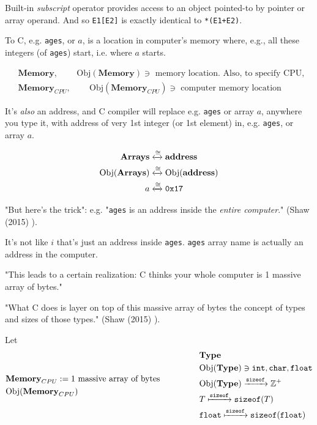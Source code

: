 \documentclass[10pt]{amsart}
\begin{document}
Built-in \emph{subscript} operator provides access to an object pointed-to by pointer or array operand.  And so \verb|E1[E2]| is exactly identical to \verb|*(E1+E2)|.  


To C, e.g. \verb|ages|, or $a$, is a location in computer's memory where, e.g., all these integers (of \verb|ages|) start, i.e. where $a$ starts.  

\[
\begin{aligned}
& \textbf{Memory} , \qquad \, \text{Obj}{(\textbf{Memory})} \ni \text{ memory location.  Also, to specify CPU, } \\ 
& \textbf{Memory}_{CPU} , \qquad \, \text{Obj}{(\textbf{Memory}_{CPU})} \ni \text{ computer memory location }
\end{aligned}
\]

It's \emph{also} an address, and C compiler will replace e.g. \verb|ages| or array $a$, anywhere you type it, with address of very 1st integer (or 1st element) in, e.g. \verb|ages|, or array $a$.  

\[
\begin{gathered}
\begin{aligned}
\textbf{Arrays} & \xleftrightarrow{ \cong } \textbf{address}  \\
\text{Obj}{(\textbf{Arrays} )} & \xleftrightarrow{ \cong } \text{Obj}{(\textbf{address} )}  \\
a & \xleftrightarrow{ \cong } \verb|0x17|  \\
\end{aligned}
\end{gathered}
\]

"But here's the trick": e.g. "\verb|ages| is an address inside the \emph{entire computer}." (Shaw (2015) \cite{Shaw2015}).  

It's not like $i$ that's just an address inside \verb|ages|.  \verb|ages| array name is actually an address in the computer.     

"This leads to a certain realization: C thinks your whole computer is 1 massive array of bytes."  

"What C does is layer on top of this massive array of bytes the concept of types and sizes of those types." (Shaw (2015) \cite{Shaw2015}).  


Let 
\[
\begin{gathered}
\begin{aligned}
& \textbf{Memory}_{CPU} := 1 \text{ massive array of bytes } \\
& \text{Obj}{(\textbf{Memory}_{CPU})} 
\end{aligned}  \qquad \, \qquad \, 
\begin{aligned}
& \textbf{Type} \\
& \text{Obj}{(\textbf{Type})} \ni \verb|int|, \verb|char|, \verb|float| \\
& \text{Obj}{(\textbf{Type})}  \xrightarrow{\texttt{sizeof}} \mathbb{Z}^+  \\
& T \xmapsto{ \texttt{sizeof} } \verb|sizeof|(T) \\
& \verb|float| \xmapsto{ \texttt{sizeof}} \verb|sizeof|(\verb|float|)
\end{aligned}
\end{gathered}
\]
\end{document}
